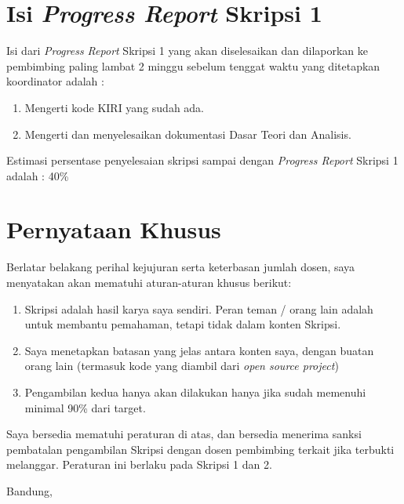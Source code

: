 \documentclass[a4paper,twoside]{article}
\begin{document}
\section{Isi {\it Progress Report} Skripsi 1}
Isi dari {\it Progress Report} Skripsi 1 yang akan diselesaikan dan dilaporkan ke pembimbing paling lambat 2 minggu sebelum tenggat waktu yang ditetapkan koordinator adalah :
\begin{enumerate}
	\item Mengerti kode KIRI yang sudah ada.
	\item Mengerti dan menyelesaikan dokumentasi Dasar Teori dan Analisis.
\end{enumerate}
Estimasi persentase penyelesaian skripsi sampai dengan {\it Progress Report} Skripsi 1 adalah : 40\%

\section{Pernyataan Khusus}
Berlatar belakang perihal kejujuran serta keterbasan jumlah dosen, saya menyatakan akan mematuhi aturan-aturan khusus berikut:
\begin{enumerate}
	\item Skripsi adalah hasil karya saya sendiri. Peran teman / orang lain adalah untuk membantu pemahaman, tetapi tidak dalam konten Skripsi.
	\item Saya menetapkan batasan yang jelas antara konten saya, dengan buatan orang lain (termasuk kode yang diambil dari {\it open source project})
	\item Pengambilan kedua hanya akan dilakukan hanya jika sudah memenuhi minimal 90\% dari target.
\end{enumerate}
Saya bersedia mematuhi peraturan di atas, dan bersedia menerima sanksi pembatalan pengambilan Skripsi dengan dosen pembimbing terkait jika terbukti melanggar. Peraturan ini berlaku pada Skripsi 1 dan 2.

\vspace{1.5cm}

\centering Bandung, \tanggal\\
\vspace{2cm} \nama \\ 
\vspace{1cm}
\end{document}
